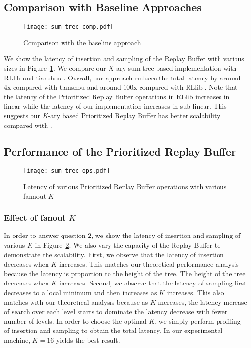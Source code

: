 \subsection{Comparison with Baseline Approaches}\label{sec:comp_baselin}
\begin{figure}
    \centering
    \texttt{[image: sum\_tree\_comp.pdf]}
    \caption{Comparison with the baseline approach}
    \label{fig:baseline_comp}
\end{figure}

We show the latency of insertion and sampling of the Replay Buffer with various sizes in Figure~\ref{fig:baseline_comp}. We compare our $K$-ary sum tree based implementation with RLlib \cite{ray_rllib} and tianshou \cite{tianshou}. Overall, our approach reduces the total latency by around 4x compared with tianshou \cite{tianshou} and around 100x compared with RLlib \cite{ray_rllib}. Note that the latency of the Prioritized Replay Buffer operations in  RLlib increases in linear while the latency of our implementation increases in sub-linear. This suggests our $K$-ary based Prioritized Replay Buffer has better scalability compared with \cite{ray_rllib}.

\subsection{Performance of the Prioritized Replay Buffer}\label{sec:perf_prioritized}
\begin{figure}
    \centering
    \texttt{[image: sum\_tree\_ops.pdf]}
    \caption{Latency of various Prioritized Replay Buffer operations with various fannout $K$}
    \label{fig:k_ary_sum_tree}
\end{figure}
\subsubsection{Effect of fanout $K$}
In order to answer question 2, we show the latency of insertion and sampling of various $K$ in Figure~\ref{fig:k_ary_sum_tree}. We also vary the capacity of the Replay Buffer to demonstrate the scalability. First, we observe that the latency of insertion decreases when $K$ increases. This matches our theoretical performance analysis because the latency is proportion to the height of the tree. The height of the tree decreases when $K$ increases. Second, we observe that the latency of sampling first decreases to a local minimum and then increases as $K$ increases. This also matches with our theoretical analysis because as $K$ increases, the latency increase of search over each level starts to dominate the latency decrease with fewer number of levels. In order to choose the optimal $K$, we simply perform profiling of insertion and sampling to obtain the total latency. In our experimental machine, $K=16$ yields the best result.

